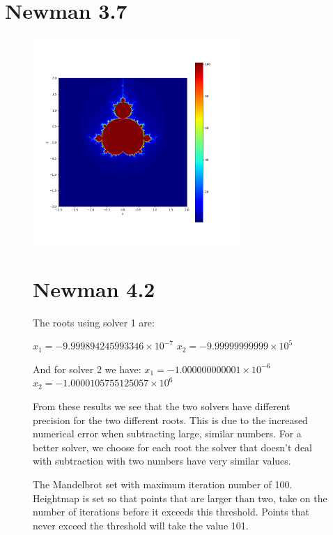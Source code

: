 \documentclass[11pt]{article}
\begin{document}
\section{Newman 3.7}
\begin{figure}[h!]
    \centering
    \includegraphics[width=0.7\textwidth]{fractal.png}
    \caption{The Mandelbrot set with maximum iteration number of 100. Heightmap is set so that points that are larger than two, take on the number of iterations before it exceeds this threshold. Points that never exceed the threshold will take the value 101.   }
    \label{fig:your_label}

\section{Newman 4.2}
The roots using solver 1 are: 

$x_1=-9.999894245993346 \times 10^{-7}$
$x_2=-9.99999999999 \times 10^{5}$

And for solver 2 we have: 
$x_1=-1.000000000001 \times 10^{-6}$
$x_2=-1.0000105755125057\times10^{6}$

From these results we see that the two solvers have different precision for the two different roots. This is due to the increased numerical error when subtracting large, similar numbers. For a better solver, we choose for each root the solver that doesn't deal with subtraction with two numbers have very similar values. 



\end{figure}
\end{document}
